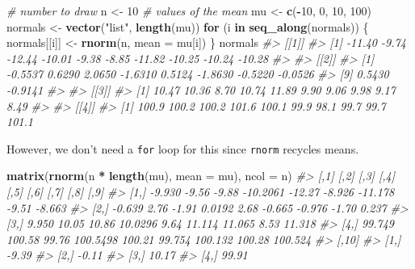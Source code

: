 \documentclass[]{book}
\newenvironment{Shaded}{\begin{snugshade}}{\end{snugshade}}
\newcommand{\CommentTok}[1]{\textcolor[rgb]{0.56,0.35,0.01}{\textit{#1}}}
\newcommand{\ControlFlowTok}[1]{\textcolor[rgb]{0.13,0.29,0.53}{\textbf{#1}}}
\newcommand{\DataTypeTok}[1]{\textcolor[rgb]{0.13,0.29,0.53}{#1}}
\newcommand{\DecValTok}[1]{\textcolor[rgb]{0.00,0.00,0.81}{#1}}
\newcommand{\KeywordTok}[1]{\textcolor[rgb]{0.13,0.29,0.53}{\textbf{#1}}}
\newcommand{\NormalTok}[1]{#1}
\newcommand{\OperatorTok}[1]{\textcolor[rgb]{0.81,0.36,0.00}{\textbf{#1}}}
\newcommand{\StringTok}[1]{\textcolor[rgb]{0.31,0.60,0.02}{#1}}
\theoremstyle{plain}
\theoremstyle{remark}
\theoremstyle{definition}
\theoremstyle{definition}
\theoremstyle{definition}
\theoremstyle{remark}
\begin{document}
\begin{Shaded}
\begin{Highlighting}[]

\CommentTok{# number to draw}
\NormalTok{n <-}\StringTok{ }\DecValTok{10}
\CommentTok{# values of the mean}
\NormalTok{mu <-}\StringTok{ }\KeywordTok{c}\NormalTok{(}\OperatorTok{-}\DecValTok{10}\NormalTok{, }\DecValTok{0}\NormalTok{, }\DecValTok{10}\NormalTok{, }\DecValTok{100}\NormalTok{)}
\NormalTok{normals <-}\StringTok{ }\KeywordTok{vector}\NormalTok{(}\StringTok{"list"}\NormalTok{, }\KeywordTok{length}\NormalTok{(mu))}
\ControlFlowTok{for}\NormalTok{ (i }\ControlFlowTok{in} \KeywordTok{seq_along}\NormalTok{(normals)) \{}
\NormalTok{  normals[[i]] <-}\StringTok{ }\KeywordTok{rnorm}\NormalTok{(n, }\DataTypeTok{mean =}\NormalTok{ mu[i])}
\NormalTok{\}}
\NormalTok{normals}
\CommentTok{#> [[1]]}
\CommentTok{#>  [1] -11.40  -9.74 -12.44 -10.01  -9.38  -8.85 -11.82 -10.25 -10.24 -10.28}
\CommentTok{#> }
\CommentTok{#> [[2]]}
\CommentTok{#>  [1] -0.5537  0.6290  2.0650 -1.6310  0.5124 -1.8630 -0.5220 -0.0526}
\CommentTok{#>  [9]  0.5430 -0.9141}
\CommentTok{#> }
\CommentTok{#> [[3]]}
\CommentTok{#>  [1] 10.47 10.36  8.70 10.74 11.89  9.90  9.06  9.98  9.17  8.49}
\CommentTok{#> }
\CommentTok{#> [[4]]}
\CommentTok{#>  [1] 100.9 100.2 100.2 101.6 100.1  99.9  98.1  99.7  99.7 101.1}
\end{Highlighting}
\end{Shaded}

However, we don't need a \texttt{for} loop for this since \texttt{rnorm}
recycles means.

\begin{Shaded}
\begin{Highlighting}[]
\KeywordTok{matrix}\NormalTok{(}\KeywordTok{rnorm}\NormalTok{(n }\OperatorTok{*}\StringTok{ }\KeywordTok{length}\NormalTok{(mu), }\DataTypeTok{mean =}\NormalTok{ mu), }\DataTypeTok{ncol =}\NormalTok{ n)}
\CommentTok{#>        [,1]   [,2]  [,3]     [,4]   [,5]   [,6]    [,7]   [,8]    [,9]}
\CommentTok{#> [1,] -9.930  -9.56 -9.88 -10.2061 -12.27 -8.926 -11.178  -9.51  -8.663}
\CommentTok{#> [2,] -0.639   2.76 -1.91   0.0192   2.68 -0.665  -0.976  -1.70   0.237}
\CommentTok{#> [3,]  9.950  10.05 10.86  10.0296   9.64 11.114  11.065   8.53  11.318}
\CommentTok{#> [4,] 99.749 100.58 99.76 100.5498 100.21 99.754 100.132 100.28 100.524}
\CommentTok{#>      [,10]}
\CommentTok{#> [1,] -9.39}
\CommentTok{#> [2,] -0.11}
\CommentTok{#> [3,] 10.17}
\CommentTok{#> [4,] 99.91}
\end{Highlighting}
\end{Shaded}
\end{document}
